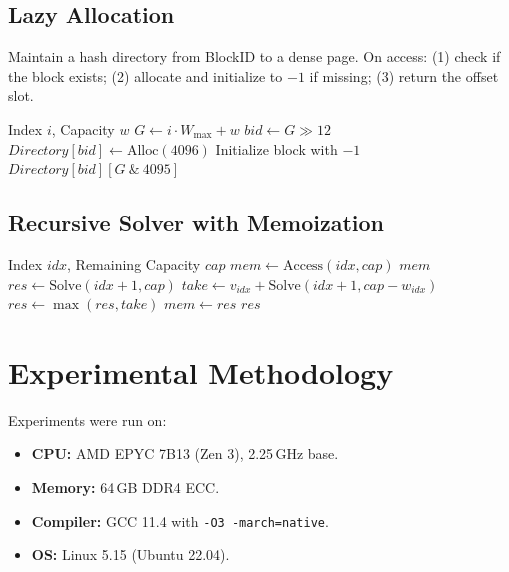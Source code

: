 \documentclass[a4paper,USenglish]{lipics-v2021}
\begin{document}
\subsection{Lazy Allocation}
Maintain a hash directory from BlockID to a dense page. On access:
(1) check if the block exists; (2) allocate and initialize to $-1$ if missing; (3) return the offset slot.

\begin{algorithm}
\caption{Block-Adaptive Access Logic}
\label{alg:access}
\begin{algorithmic}[1]
\REQUIRE Index $i$, Capacity $w$
\STATE $G \leftarrow i \cdot W_{\max} + w$
\STATE $bid \leftarrow G \gg 12$
  \STATE $Directory[bid] \leftarrow \text{Alloc}(4096)$
  \STATE Initialize block with $-1$
\ENDIF
\RETURN $Directory[bid][G \ \&\ 4095]$
\end{algorithmic}
\end{algorithm}

\subsection{Recursive Solver with Memoization}
\begin{algorithm}
\caption{BAL Recursive Solver}
\label{alg:solve}
\begin{algorithmic}[1]
\REQUIRE Index $idx$, Remaining Capacity $cap$
\ENDIF
\STATE $mem \leftarrow \text{Access}(idx, cap)$
  \RETURN $mem$
\ENDIF
\STATE $res \leftarrow \text{Solve}(idx+1, cap)$
  \STATE $take \leftarrow v_{idx} + \text{Solve}(idx+1, cap - w_{idx})$
  \STATE $res \leftarrow \max(res, take)$
\ENDIF
\STATE $mem \leftarrow res$
\RETURN $res$
\end{algorithmic}
\end{algorithm}

\section{Experimental Methodology}
Experiments were run on:
\begin{itemize}
  \item \textbf{CPU:} AMD EPYC 7B13 (Zen 3), 2.25\,GHz base.
  \item \textbf{Memory:} 64\,GB DDR4 ECC.
  \item \textbf{Compiler:} GCC 11.4 with \texttt{-O3 -march=native}.
  \item \textbf{OS:} Linux 5.15 (Ubuntu 22.04).
\end{itemize}
\end{document}
